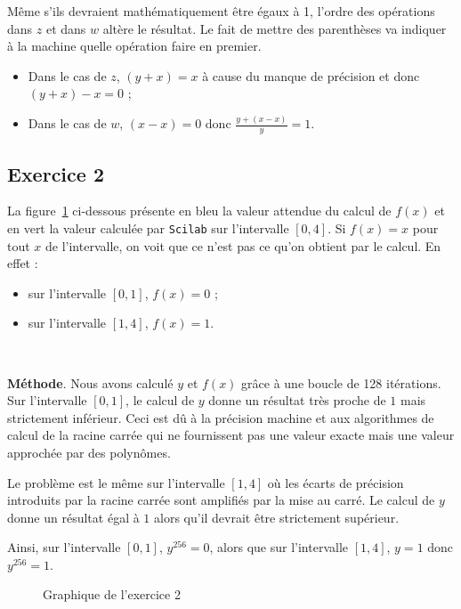 \documentclass[a4paper,11pt]{article}
\theoremstyle{nonumberplain}
\theoremstyle{nonumberplain}
\theoremstyle{nonumberplain}
\begin{document}
    Même s'ils devraient mathématiquement être égaux à 1, l'ordre des opérations dans $z$ et dans $w$ altère le résultat.
    Le fait de mettre des parenthèses va indiquer à la machine quelle opération faire en premier.
    \begin{itemize}
        \item Dans le cas de $z$, $(y + x) = x$ à cause du manque de précision et donc $(y + x) - x = 0$ ;
        \item Dans le cas de $w$, $(x - x) = 0$ donc $\frac{y + (x -x)}{y} = 1$.
    \end{itemize}


\subsection*{Exercice 2}

    La figure~\ref{graph_exo2} ci-dessous présente en bleu la valeur attendue du calcul de $f(x)$ et en vert la valeur calculée par \texttt{Scilab} sur l'intervalle $[0, 4]$.
    Si $f(x) = x$ pour tout $x$ de l'intervalle, on voit que ce n'est pas ce qu'on obtient par le calcul. En effet :

    \begin{itemize}
        \item sur l'intervalle $[0, 1]$, $f(x) = 0$ ;
        \item sur l'intervalle $[1, 4]$, $f(x) = 1$.
    \end{itemize}~\newline

    \textbf{Méthode}. Nous avons calculé $y$ et $f(x)$ grâce à une boucle de 128 itérations.
    Sur l'intervalle $[0, 1]$, le calcul de $y$ donne un résultat très proche de $1$ mais strictement inférieur. Ceci est dû à la précision machine
    et aux algorithmes de calcul de la racine carrée qui ne fournissent pas une valeur exacte mais une valeur approchée par des polynômes.

    Le problème est le même sur l'intervalle $[1, 4]$ où les écarts de précision introduits par la racine carrée sont amplifiés par la mise au carré. Le calcul de $y$ donne
    un résultat égal à $1$ alors qu'il devrait être strictement supérieur.

    Ainsi, sur l'intervalle $[0, 1]$, $y^{256} = 0$, alors que sur l'intervalle $[1, 4]$, $y = 1$ donc $y^{256} = 1$.

    \begin{figure}
        \centering
        \caption{\label{graph_exo2} Graphique de l'exercice 2}
    \end{figure}
\end{document}
